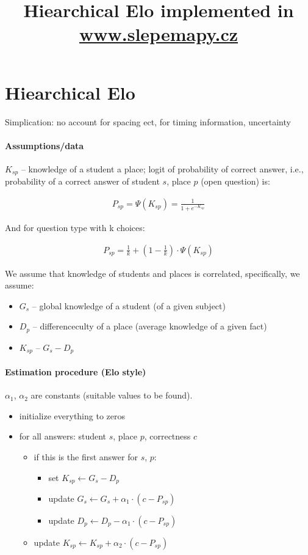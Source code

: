 \documentclass[a4paper]{article}
\title{Hiearchical Elo implemented in \url{www.slepemapy.cz}}
\begin{document}
\maketitle

\section{Hiearchical Elo}

Simplication: no account for spacing ect, for timing information, uncertainty

\paragraph{Assumptions/data} $K_{sp}$ -- knowledge of a student a place; logit of probability
of correct answer, i.e., probability of a correct answer of student $s$, place $p$ (open
question) is:

\begin{align}
P_{sp} = \Psi(K_{sp}) = \frac{1}{1 + e^{-K_{sp}}}
\end{align}

And for question type with k choices:

\begin{align}
P_{sp} = \frac{1}{k} + \left(1 - \frac{1}{k}\right) \cdot \Psi(K_{sp})
\end{align}

We assume that knowledge of students and places is correlated, specifically,
we assume:

\begin{itemize}
	\item	$G_s$ -- global knowledge of a student (of a given subject)
	\item	$D_p$ -- differenceculty of a place (average knowledge of a given fact)
	\item	$K_{sp}$ -- $G_s - D_p$
\end{itemize}

\paragraph{Estimation procedure (Elo style)} $\alpha_1$, $\alpha_2$ are constants (suitable values to be found).

\begin{itemize}
	\item	initialize everything to zeros
	\item for all answers: student $s$, place $p$, correctness $c$
		\begin{itemize}
			\item	if this is the first answer for $s$, $p$:
				\begin{itemize}
					\item	set $K_{sp} \gets G_s - D_p$
					\item	update $G_s \gets G_s + \alpha_1 \cdot (c - P_{sp})$
					\item	update $D_p \gets D_p - \alpha_1 \cdot (c - P_{sp})$
				\end{itemize}
			\item	update $K_{sp} \gets K_{sp} + \alpha_2 \cdot (c - P_{sp})$
		\end{itemize}
\end{itemize}
\end{document}
